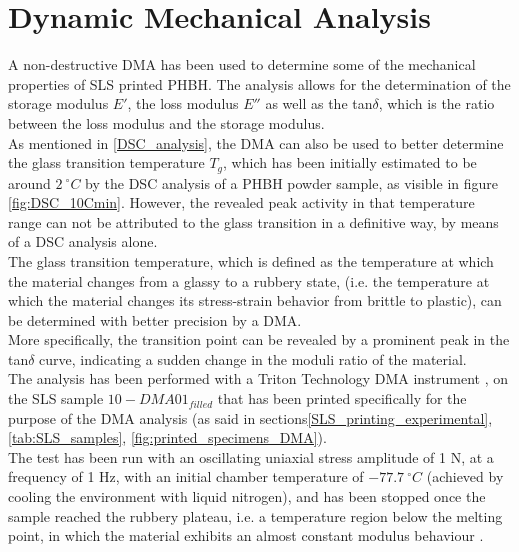 \documentclass{article}
\begin{document}
        \clearpage

    \section{Dynamic Mechanical Analysis\label{DMA}}
 
    A non-destructive DMA has been used to determine some of the mechanical properties of SLS printed PHBH. The analysis 
    allows for the determination of the storage modulus $E'$, the loss modulus $E''$ as well as the tan$\delta$, 
    which is the ratio between the loss modulus and the storage modulus. \\ 
    As mentioned in \ref{DSC_analysis}, the DMA can also be used to better determine the glass transition temperature $T_g$, which 
    has been initially estimated to be around $2 \ ^{\circ}C$ by the DSC analysis of a PHBH powder sample, as visible in figure \ref{fig:DSC_10Cmin}. 
    However, the revealed 
    peak activity in that temperature range can not be attributed to the glass transition in a definitive way, by means of a DSC analysis 
    alone. \\ 

    The glass transition temperature, which is defined as the temperature at which the material changes from a glassy to a rubbery state, 
    (i.e. the temperature at which the material changes its stress-strain behavior from brittle to plastic), can be determined with 
    better precision by a DMA. \\ 

    More specifically, the transition point can be revealed by a prominent peak in the tan$\delta$ curve, indicating a 
    sudden change in the moduli ratio of the material. \\ 
    
    The analysis has been performed with a Triton Technology DMA instrument \autocites{Triton_Technology_Ltd}, on the SLS sample 
    $10-DMA01_{filled}$ that has been printed specifically for the purpose of the DMA analysis 
    (as said in sections\ref{SLS_printing_experimental}, \ref{tab:SLS_samples}, \ref{fig:printed_specimens_DMA}). \\ 

    The test has been run with an oscillating uniaxial stress amplitude of 1 N, at a frequency of 1 Hz, with an initial 
    chamber temperature of $- 77.7 \ ^{\circ}C$ (achieved by cooling the environment with liquid nitrogen), and has been stopped 
    once the sample reached the rubbery plateau, i.e. a temperature region below the melting point, in which the material 
    exhibits an almost constant modulus behaviour \autocites{JD_Ferry_viscoelasticpolymers}. \\
\end{document}
